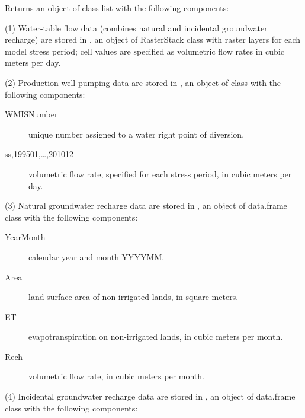 \documentclass[a4paper]{book}
\begin{document}
\begin{Value}
Returns an object of class list with the following components:

(1) Water-table flow data (combines natural and incidental groundwater recharge)
are stored in ,
an object of RasterStack class with raster layers for each model stress period;
cell values are specified as volumetric flow rates in cubic meters per day.

(2) Production well pumping data are stored in ,
an object of  class with the following components:
\begin{description}

\item[WMISNumber] unique number assigned to a water right point of diversion.
\item[ss,199501,\dots,201012] volumetric flow rate, specified for each stress period,
in cubic meters per day.

\end{description}


(3) Natural groundwater recharge data are stored in ,
an object of data.frame class with the following components:
\begin{description}

\item[YearMonth] calendar year and month YYYYMM.
\item[Area] land-surface area of non-irrigated lands, in square meters.
\item[ET] evapotranspiration on non-irrigated lands, in cubic meters per month.
\item[Rech] volumetric flow rate, in cubic meters per month.

\end{description}


(4) Incidental groundwater recharge data are stored in ,
an object of data.frame class with the following components:
\begin{description}


\end{description}
\end{Value}
\end{document}
